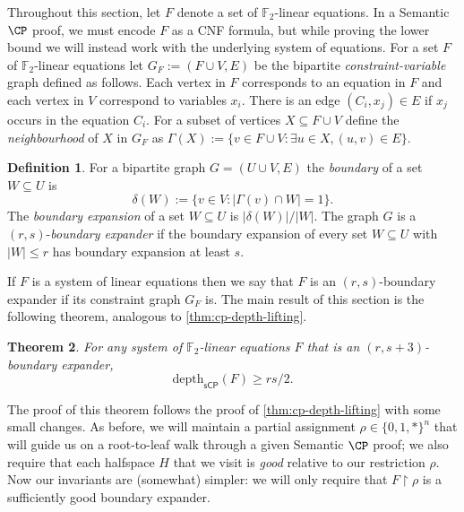 \documentclass[11pt]{article}
\numberwithin{equation}{section}
\newtheorem{theorem}{Theorem}[section]
\theoremstyle{definition}
\newtheorem{definition}[theorem]{Definition}
\theoremstyle{plain}
\newcounter{cor}\renewcommand{\thecor}{1.1.\arabic{cor}}\newenvironment{cor}{\ifnum\value{cor}=0\refstepcounter{cor}\else\PackageError{toc-native-compat}{Unsupported additional cor envelope}{Only the one exact source-observed cor paragraph is allowed.}\fi}{}\providecommand{\corautorefname}{Theorem}
\renewcommand{\restriction}{\!\!\upharpoonright}
\newcommand{\depth}{\ensuremath{\mathrm{depth}}}
\renewcommand{\restriction}{\!\ensuremath{\upharpoonright}\!}
\newcommand{\sCP}{\ensuremath{\mathsf{sCP}}}
\begin{document}
Throughout this section, let $F$ denote a set of $\mathbb{F}_2$-linear equations.
In a Semantic $\CP$ proof, we must encode $F$ as a CNF formula, but while proving the lower bound we will instead work with the underlying system of equations.
For a set $F$ of $\mathbb{F}_2$-linear equations let $G_F := (F \cup V, E)$ be the bipartite \emph{constraint-variable} graph defined as follows. 
Each vertex in $F$ corresponds to an equation in $F$ and each vertex in $V$ correspond to variables $x_i$. 
There is an edge $(C_i,x_j) \in E$ if $x_j$ occurs in the equation $C_i$.
For a subset of vertices $X \subseteq F \cup V$ define the \emph{neighbourhood} of $X$ in $G_F$ as $\Gamma(X):= \{v \in F \cup V : \exists u \in X, (u,v) \in E\}$.

\begin{definition}\label{def:expansion}
	For a bipartite graph $G=(U \cup V, E)$ the \emph{boundary} of a set $W \subseteq U$ is \[\delta(W):= \{v \in V : |\Gamma(v) \cap W| = 1\}.\]
	The \emph{boundary expansion} of a set $W \subseteq U$ is $|\delta(W)|/|W|$. 
	The graph $G$ is a $(r, s)$-\emph{boundary expander} if the boundary expansion of every set $W \subseteq U$ with $|W| \leq r$ has boundary expansion at least $s$.
\end{definition}

If $F$ is a system of linear equations then we say that $F$ is an $(r,s)$-boundary expander if its constraint graph $G_{F}$ is.
The main result of this section is the following theorem, analogous to \autoref{thm:cp-depth-lifting}.

\begin{theorem}\label{thm:expander-lb}
	For any system of $\mathbb{F}_2$-linear equations $F$ that is an $(r, s+3)$-boundary expander, \[\depth_{\sCP}(F) \geq rs/2.\]
\end{theorem}

The proof of this theorem follows the proof of \autoref{thm:cp-depth-lifting} with some small changes.
As before, we will maintain a partial assignment $\rho \in \{0,1,*\}^n$ that will guide us on a root-to-leaf walk through a given Semantic $\CP$ proof; we also require that each halfspace $H$ that we visit is \emph{good} relative to our restriction $\rho$.
Now our invariants are (somewhat) simpler: we will only require that $F \restriction \rho$ is a sufficiently good boundary expander.
\end{document}
